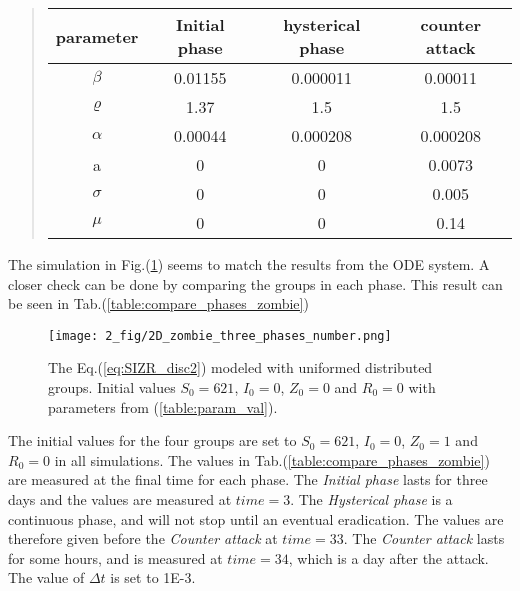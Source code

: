 \documentclass[%
twoside,                 %
final,                   %
chapterprefix=true,      %
open=right               %
10pt]{book}
\begin{document}
\label{table:param_val}

\begin{quote}
\begin{tabular}{cccc}
\hline
\multicolumn{1}{c}{ parameter } & \multicolumn{1}{c}{ Initial phase } & \multicolumn{1}{c}{ hysterical phase } & \multicolumn{1}{c}{ counter attack } \\
\hline
$\beta$   & 0.01155       & 0.000011         & 0.00011        \\
$\varrho$ & 1.37          & 1.5              & 1.5            \\
$\alpha$  & 0.00044       & 0.000208         & 0.000208       \\
a         & 0             & 0                & 0.0073         \\
$\sigma$  & 0             & 0                & 0.005          \\
$\mu$     & 0             & 0                & 0.14           \\
\hline
\end{tabular}
\end{quote}

\noindent
The simulation in Fig.(\ref{fig:zombie_three_number}) seems to match the results from the ODE system. A closer check can be done by comparing the groups in each phase. This result can be seen in Tab.(\ref{table:compare_phases_zombie}) 


\begin{figure}[ht]
  \centerline{\texttt{[image: 2\_fig/2D\_zombie\_three\_phases\_number.png]}}
  \caption{
  \label{fig:zombie_three_number} The Eq.(\ref{eq:SIZR_disc2}) modeled with uniformed distributed groups. Initial values $S_0 = 621$, $I_0 = 0$, $Z_0 = 0$ and  $R_0 = 0$ with parameters from (\ref{table:param_val}).
  }
\end{figure}




\vspace{3mm}




\vspace{3mm}


The initial values for the four groups are set to $S_0=621$, $I_0=0$, $Z_0=1$ and $R_0= 0$ in all simulations. The values in Tab.(\ref{table:compare_phases_zombie}) are measured at the final time for each phase. The \emph{Initial phase} lasts for three days and the values are measured at $time=3$. The \emph{Hysterical phase} is a continuous phase, and will not stop until an eventual eradication. The values are therefore given before the \emph{Counter attack} at $time=33$. The \emph{Counter attack} lasts for some hours, and is measured at $time=34$, which is a day after the attack. The value of $\Delta t$ is set to 1E-3. 
\end{document}
